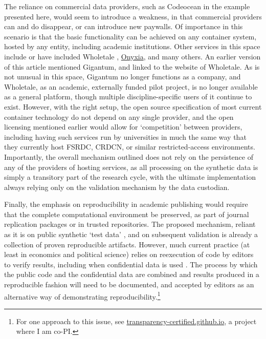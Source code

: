 \documentclass[inline]{hdsr}
\begin{document}
The reliance on commercial data providers, such as Codeocean in the example presented here, would seem to introduce a weakness, in that commercial providers can and do disappear, or can introduce new paywalls. Of importance in this scenario is that the  basic functionality can be achieved on any container system, hosted by any entity, including academic institutions. Other services in this space include  or have included {Wholetale} \citep{brinckman_computing_2018,chard_toward_2020}, \href{https://www.onyxia.sh/}{Onyxia}, and many others. An earlier version of this article mentioned Gigantum, and linked to the website of Wholetale. As is not unusual in this space, Gigantum no longer functions as a company, and Wholetale, as an academic, externally funded pilot project, is no longer available as a general platform, though multiple discipline-specific users of it continue to exist. However, with the right setup, the open source specification of most current container technology do not depend on any single provider, and the open licensing mentioned earlier would allow for `competition' between providers, including having such services run by universities in much the same way that they currently host \ac{FSRDC}, \ac{CRDCN}, or similar restricted-access environments. Importantly, the overall mechanism outlined does not rely on the persistence of any of the providers of hosting services, as all processing on the synthetic data is simply a transitory part of the research cycle, with the ultimate implementation always relying only on the validation mechanism by the data custodian.

Finally, the emphasis on reproducibility in academic publishing would require that the complete computational environment be preserved, as part of journal replication packages or in trusted repositories. The proposed mechanism, reliant as it is on public synthetic `test data' \citep{krafczykScientificTestsContinuous2019}, and on subsequent validation is already a collection of proven reproducible artifacts. However, much current practice (at least in economics and political science) relies on reexecution of code by editors to verify results, including when confidential data is used \citep{perignonCertifyReproducibilityConfidential2019,jonesIntroducingReproducibleResearch2024}. The process by which the public code and the confidential data are combined and results produced in a reproducible fashion will need to be documented, and accepted by editors as an alternative way of demonstrating reproducibility.\footnote{For one approach to this issue, see \href{https://transparency-certified.github.io}{transparency-certified.github.io}, a project where I am co-PI.}
%
\end{document}
